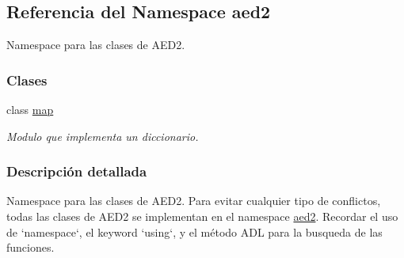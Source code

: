 \hypertarget{namespaceaed2}{\subsection{\-Referencia del \-Namespace aed2}
\label{namespaceaed2}
}


\-Namespace para las clases de \-A\-E\-D2.  


\subsubsection*{\-Clases}
\begin{DoxyCompactItemize}
\item 
class \hyperlink{classaed2_1_1map}{map}
\begin{DoxyCompactList}\small\item\em \-Modulo que implementa un diccionario. \end{DoxyCompactList}\end{DoxyCompactItemize}


\subsubsection{\-Descripción detallada}
\-Namespace para las clases de \-A\-E\-D2. \-Para evitar cualquier tipo de conflictos, todas las clases de \-A\-E\-D2 se implementan en el namespace \hyperlink{namespaceaed2}{aed2}. \-Recordar el uso de `namespace`, el keyword `using`, y el método \-A\-D\-L para la busqueda de las funciones. 